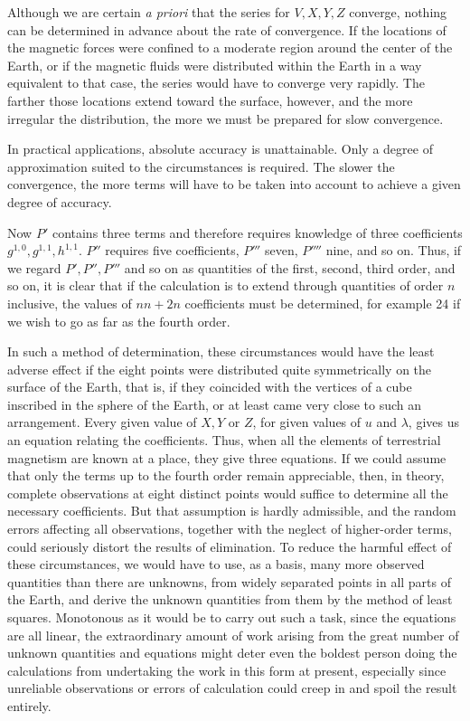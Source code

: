 Although we are certain \textit{a priori} that the series for $V,X,Y,Z$ converge, nothing can be determined in advance about the rate of convergence. If the locations of the magnetic forces were confined to a moderate region around the center of the Earth, or if the magnetic fluids were distributed within the Earth in a way equivalent to that case, the series would have to converge very rapidly. The farther those locations extend toward the surface, however, and the more irregular the distribution, the more we must be prepared for slow convergence.

In practical applications, absolute accuracy is unattainable. Only a degree of approximation suited to the circumstances is required. The slower the convergence, the more terms will have to be taken into account to achieve a given degree of accuracy.

Now $P'$ contains three terms and therefore requires knowledge of three coefficients $g^{1,0},g^{1,1},h^{1,1}$. $P''$ requires five coefficients, $P'''$ seven, $P''''$ nine, and so on. Thus, if we regard $P',P'',P'''$ and so on as quantities of the first, second, third order, and so on, it is clear that if the calculation is to extend through quantities of order $n$ inclusive, the values of $nn+2n$ coefficients must be determined, for example 24 if we wish to go as far as the fourth order.

\expandafter\def\csname HistoricalNoteText18\endcsname{In such a method of determination, these circumstances would have the least adverse effect if the eight points were distributed quite symmetrically on the surface of the Earth, that is, if they coincided with the vertices of a cube inscribed in the sphere of the Earth, or at least came very close to such an arrangement.}
Every given value of $X,Y$ or $Z$, for given values of $u$ and $\lambda$, gives us an equation relating the coefficients. Thus, when all the elements of terrestrial magnetism are known at a place, they give three equations. If we could assume that only the terms up to the fourth order remain appreciable, then, in theory, complete observations at eight distinct points would suffice to determine all the necessary coefficients. But that assumption is hardly admissible, and the random errors affecting all observations, together with the neglect of higher-order terms, could seriously distort the results of elimination. To reduce the harmful effect of these circumstances, we would have to use, as a basis, many more observed quantities than there are unknowns, from widely separated points in all parts of the Earth, and derive the unknown quantities from them by the method of least squares. Monotonous as it would be to carry out such a task, since the equations are all linear, the extraordinary amount of work arising from the great number of unknown quantities and equations might deter even the boldest person doing the calculations from undertaking the work in this form at present, especially since unreliable observations or errors of calculation could creep in and spoil the result entirely.

